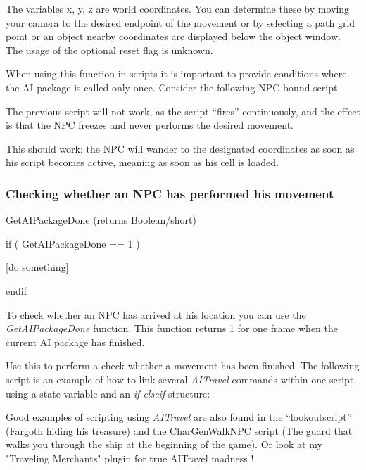 \documentclass[
]{article}
\begin{document}
The variables x, y, z are world coordinates. You can determine these by
moving your camera to the desired endpoint of the movement or by
selecting a path grid point or an object nearby coordinates are
displayed below the object window. The usage of the optional reset flag
is unknown.

When using this function in scripts it is important to provide
conditions where the AI package is called only once. Consider the
following NPC bound script



The previous script will not work, as the script ``fires'' continuously,
and the effect is that the NPC freezes and never performs the desired
movement.



This should work; the NPC will wander to the designated coordinates as
soon as his script becomes active, meaning as soon as his cell is
loaded.

\hypertarget{checking-whether-an-npc-has-performed-his-movement}{%
\subsubsection{Checking whether an NPC has performed his
movement}\label{checking-whether-an-npc-has-performed-his-movement}}

GetAIPackageDone (returns Boolean/short)

if ( GetAIPackageDone == 1 )

{[}do something{]}

endif

To check whether an NPC has arrived at his location you can use the
\emph{GetAIPackageDone} function. This function returns 1 for one frame
when the current AI package has finished.

Use this to perform a check whether a movement has been finished. The
following script is an example of how to link several \emph{AITravel}
commands within one script, using a state variable and an
\emph{if-elseif} structure:



Good examples of scripting using \emph{AITravel} are also found in the
``lookoutscript'' (Fargoth hiding his treasure) and the CharGenWalkNPC
script (The guard that walks you through the ship at the beginning of
the game). Or look at my "Traveling Merchants" plugin for true AITravel
madness !
\end{document}
